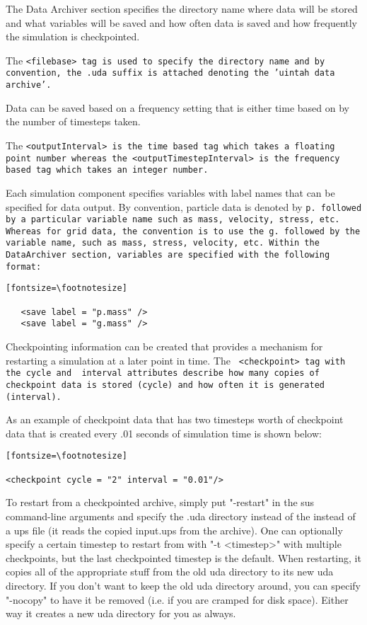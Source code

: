 The Data Archiver section specifies the directory name where data will
be stored and what variables will be saved and how often data is saved
and how frequently the simulation is checkpointed.

The \tt <filebase> \normalfont tag is used to specify the directory
name and by convention, the .uda suffix is attached denoting the
'uintah data archive'.


Data can be saved based on a frequency setting that is either time
based on by the number of timesteps taken.

The \tt <outputInterval> \normalfont is the time based tag which takes
a floating point number whereas the \tt <outputTimestepInterval>
\normalfont is the frequency based tag which takes an integer number.


Each simulation component specifies variables with label names that
can be specified for data output.  By convention, particle data is
denoted by \tt p. \normalfont followed by a particular variable name
such as mass, velocity, stress, etc.  Whereas for grid data, the
convention is to use the \tt g. \normalfont followed by the variable
name, such as mass, stress, velocity, etc.  Within the DataArchiver
section, variables are specified with the following format:

\begin{verbatim}[fontsize=\footnotesize]

   <save label = "p.mass" />
   <save label = "g.mass" />

\end{verbatim}


Checkpointing information can be created that provides a mechanism for
restarting a simulation at a later point in time.  The \tt
<checkpoint> \normalfont tag with the \tt cycle \normalfont and \tt
interval \normalfont attributes describe how many copies of checkpoint
data is stored (cycle)  and how often it is generated (interval).

As an example of checkpoint data that has two timesteps worth of
checkpoint data that is created every .01 seconds of simulation time
is shown below:

\begin{verbatim}[fontsize=\footnotesize]

<checkpoint cycle = "2" interval = "0.01"/>

\end{verbatim}


To restart from a checkpointed archive, simply put "-restart" in the
sus command-line arguments and specify the .uda directory instead of
the instead of a ups file (it reads the copied input.ups from the
archive).  One can optionally specify a certain timestep to restart
from with "-t <timestep>" with multiple checkpoints, but the
last checkpointed timestep is the default.  When restarting, it
copies all of the appropriate stuff from the old uda directory to its
new uda directory.  If you don't want to keep the old uda directory
around, you can specify "-nocopy" to have it be removed (i.e. if you
are cramped for disk space).  Either way it creates a new uda
directory for you as always.

